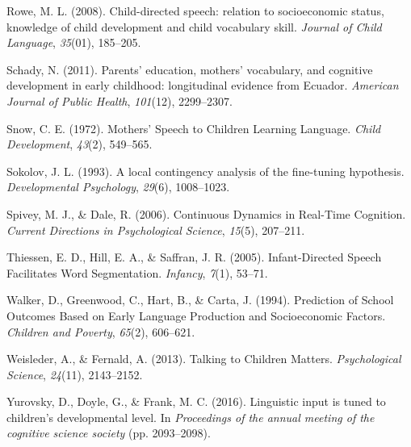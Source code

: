 \documentclass[10pt, letterpaper]{article}
\begin{document}
\leavevmode\hypertarget{ref-ROWE:2008go}{}%
Rowe, M. L. (2008). Child-directed speech: relation to socioeconomic
status, knowledge of child development and child vocabulary skill.
\emph{Journal of Child Language}, \emph{35}(01), 185--205.

\leavevmode\hypertarget{ref-Schady:2011bb}{}%
Schady, N. (2011). Parents' education, mothers' vocabulary, and
cognitive development in early childhood: longitudinal evidence from
Ecuador. \emph{American Journal of Public Health}, \emph{101}(12),
2299--2307.

\leavevmode\hypertarget{ref-Snow:2018wf}{}%
Snow, C. E. (1972). Mothers' Speech to Children Learning Language.
\emph{Child Development}, \emph{43}(2), 549--565.

\leavevmode\hypertarget{ref-Sokolov:1993cr}{}%
Sokolov, J. L. (1993). A local contingency analysis of the fine-tuning
hypothesis. \emph{Developmental Psychology}, \emph{29}(6), 1008--1023.

\leavevmode\hypertarget{ref-Spivey:2006fa}{}%
Spivey, M. J., \& Dale, R. (2006). Continuous Dynamics in Real-Time
Cognition. \emph{Current Directions in Psychological Science},
\emph{15}(5), 207--211.

\leavevmode\hypertarget{ref-Thiessen:2005tx}{}%
Thiessen, E. D., Hill, E. A., \& Saffran, J. R. (2005). Infant-Directed
Speech Facilitates Word Segmentation. \emph{Infancy}, \emph{7}(1),
53--71.

\leavevmode\hypertarget{ref-Anonymous:GIFaG1Qd}{}%
Walker, D., Greenwood, C., Hart, B., \& Carta, J. (1994). Prediction of
School Outcomes Based on Early Language Production and Socioeconomic
Factors. \emph{Children and Poverty}, \emph{65}(2), 606--621.

\leavevmode\hypertarget{ref-Weisleder:2013ht}{}%
Weisleder, A., \& Fernald, A. (2013). Talking to Children Matters.
\emph{Psychological Science}, \emph{24}(11), 2143--2152.

\leavevmode\hypertarget{ref-Anonymous:r2JoRscQ}{}%
Yurovsky, D., Doyle, G., \& Frank, M. C. (2016). Linguistic input is
tuned to children's developmental level. In \emph{Proceedings of the
annual meeting of the cognitive science society} (pp. 2093--2098).


\end{document}
